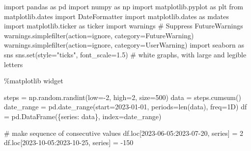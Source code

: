 \documentclass[
  letterpaper,
  DIV=11,
  numbers=noendperiod,
  oneside]{scrreprt}
\newenvironment{Shaded}{\begin{snugshade}}{\end{snugshade}}
\newcommand{\BuiltInTok}[1]{\textcolor[rgb]{0.00,0.23,0.31}{#1}}
\newcommand{\CommentTok}[1]{\textcolor[rgb]{0.37,0.37,0.37}{#1}}
\newcommand{\DecValTok}[1]{\textcolor[rgb]{0.68,0.00,0.00}{#1}}
\newcommand{\FloatTok}[1]{\textcolor[rgb]{0.68,0.00,0.00}{#1}}
\newcommand{\ImportTok}[1]{\textcolor[rgb]{0.00,0.46,0.62}{#1}}
\newcommand{\NormalTok}[1]{\textcolor[rgb]{0.00,0.23,0.31}{#1}}
\newcommand{\OperatorTok}[1]{\textcolor[rgb]{0.37,0.37,0.37}{#1}}
\newcommand{\PreprocessorTok}[1]{\textcolor[rgb]{0.68,0.00,0.00}{#1}}
\newcommand{\StringTok}[1]{\textcolor[rgb]{0.13,0.47,0.30}{#1}}
\begin{document}
\begin{Shaded}
\begin{Highlighting}[]
\ImportTok{import}\NormalTok{ pandas }\ImportTok{as}\NormalTok{ pd}
\ImportTok{import}\NormalTok{ numpy }\ImportTok{as}\NormalTok{ np}
\ImportTok{import}\NormalTok{ matplotlib.pyplot }\ImportTok{as}\NormalTok{ plt}
\ImportTok{from}\NormalTok{ matplotlib.dates }\ImportTok{import}\NormalTok{ DateFormatter}
\ImportTok{import}\NormalTok{ matplotlib.dates }\ImportTok{as}\NormalTok{ mdates}
\ImportTok{import}\NormalTok{ matplotlib.ticker }\ImportTok{as}\NormalTok{ ticker}
\ImportTok{import}\NormalTok{ warnings}
\CommentTok{\# Suppress FutureWarnings}
\NormalTok{warnings.simplefilter(action}\OperatorTok{=}\StringTok{\textquotesingle{}ignore\textquotesingle{}}\NormalTok{, category}\OperatorTok{=}\PreprocessorTok{FutureWarning}\NormalTok{)}
\NormalTok{warnings.simplefilter(action}\OperatorTok{=}\StringTok{\textquotesingle{}ignore\textquotesingle{}}\NormalTok{, category}\OperatorTok{=}\PreprocessorTok{UserWarning}\NormalTok{)}
\ImportTok{import}\NormalTok{ seaborn }\ImportTok{as}\NormalTok{ sns}
\NormalTok{sns.}\BuiltInTok{set}\NormalTok{(style}\OperatorTok{=}\StringTok{"ticks"}\NormalTok{, font\_scale}\OperatorTok{=}\FloatTok{1.5}\NormalTok{)  }\CommentTok{\# white graphs, with large and legible letters}

\OperatorTok{\%}\NormalTok{matplotlib widget}
\end{Highlighting}
\end{Shaded}

\begin{Shaded}
\begin{Highlighting}[]
\NormalTok{steps }\OperatorTok{=}\NormalTok{ np.random.randint(low}\OperatorTok{={-}}\DecValTok{2}\NormalTok{, high}\OperatorTok{=}\DecValTok{2}\NormalTok{, size}\OperatorTok{=}\DecValTok{500}\NormalTok{)}
\NormalTok{data }\OperatorTok{=}\NormalTok{ steps.cumsum()}
\NormalTok{date\_range }\OperatorTok{=}\NormalTok{ pd.date\_range(start}\OperatorTok{=}\StringTok{\textquotesingle{}2023{-}01{-}01\textquotesingle{}}\NormalTok{, periods}\OperatorTok{=}\BuiltInTok{len}\NormalTok{(data), freq}\OperatorTok{=}\StringTok{\textquotesingle{}1D\textquotesingle{}}\NormalTok{)}
\NormalTok{df }\OperatorTok{=}\NormalTok{ pd.DataFrame(\{}\StringTok{\textquotesingle{}series\textquotesingle{}}\NormalTok{: data\}, index}\OperatorTok{=}\NormalTok{date\_range)}

\CommentTok{\# make sequence of consecutive values}
\NormalTok{df.loc[}\StringTok{\textquotesingle{}2023{-}06{-}05\textquotesingle{}}\NormalTok{:}\StringTok{\textquotesingle{}2023{-}07{-}20\textquotesingle{}}\NormalTok{, }\StringTok{\textquotesingle{}series\textquotesingle{}}\NormalTok{] }\OperatorTok{=} \DecValTok{2}
\NormalTok{df.loc[}\StringTok{\textquotesingle{}2023{-}10{-}05\textquotesingle{}}\NormalTok{:}\StringTok{\textquotesingle{}2023{-}10{-}25\textquotesingle{}}\NormalTok{, }\StringTok{\textquotesingle{}series\textquotesingle{}}\NormalTok{] }\OperatorTok{=} \OperatorTok{{-}}\DecValTok{150}
\end{Highlighting}
\end{Shaded}
\end{document}
